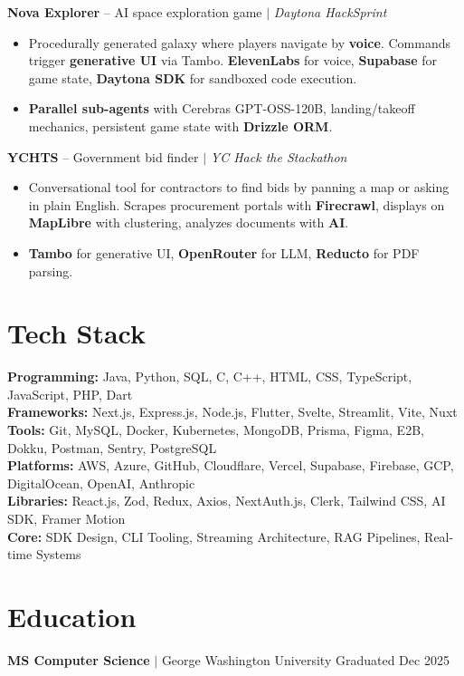 \documentclass[10pt,a4paper]{article}
\begin{document}
\textbf{Nova Explorer} -- AI space exploration game $|$ \textit{Daytona HackSprint}
\begin{itemize}
    \item Procedurally generated galaxy where players navigate by \textbf{voice}. Commands trigger \textbf{generative UI} via Tambo. \textbf{ElevenLabs} for voice, \textbf{Supabase} for game state, \textbf{Daytona SDK} for sandboxed code execution.
    \item \textbf{Parallel sub-agents} with Cerebras GPT-OSS-120B, landing/takeoff mechanics, persistent game state with \textbf{Drizzle ORM}.
\end{itemize}

\textbf{YCHTS} -- Government bid finder $|$ \textit{YC Hack the Stackathon}
\begin{itemize}
    \item Conversational tool for contractors to find bids by panning a map or asking in plain English. Scrapes procurement portals with \textbf{Firecrawl}, displays on \textbf{MapLibre} with clustering, analyzes documents with \textbf{AI}.
    \item \textbf{Tambo} for generative UI, \textbf{OpenRouter} for LLM, \textbf{Reducto} for PDF parsing.
\end{itemize}

\section{Tech Stack}

\textbf{Programming:} Java, Python, SQL, C, C++, HTML, CSS, TypeScript, JavaScript, PHP, Dart \\
\textbf{Frameworks:} Next.js, Express.js, Node.js, Flutter, Svelte, Streamlit, Vite, Nuxt \\
\textbf{Tools:} Git, MySQL, Docker, Kubernetes, MongoDB, Prisma, Figma, E2B, Dokku, Postman, Sentry, PostgreSQL \\
\textbf{Platforms:} AWS, Azure, GitHub, Cloudflare, Vercel, Supabase, Firebase, GCP, DigitalOcean, OpenAI, Anthropic \\
\textbf{Libraries:} React.js, Zod, Redux, Axios, NextAuth.js, Clerk, Tailwind CSS, AI SDK, Framer Motion \\
\textbf{Core:} SDK Design, CLI Tooling, Streaming Architecture, RAG Pipelines, Real-time Systems

\section{Education}

\textbf{MS Computer Science} $|$ George Washington University \hfill Graduated Dec 2025
\end{document}
